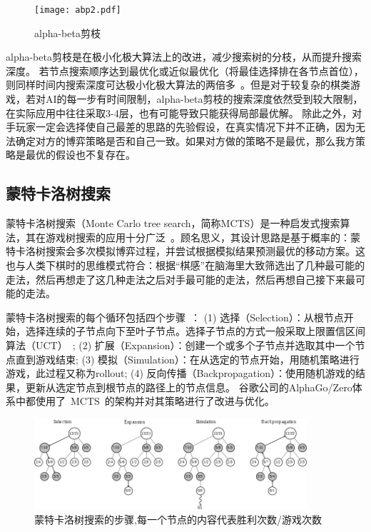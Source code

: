 \begin{figure}[htb]
    \centering
    \texttt{[image: abp2.pdf]}
    \caption[abp2]{%
    alpha-beta剪枝~\cite{russell2010artificial}%
      }
    \label{fig:abp2}
  \end{figure}
\newpage
alpha-beta剪枝是在极小化极大算法上的改进，减少搜索树的分枝，从而提升搜索深度。
若节点搜索顺序达到最优化或近似最优化（将最佳选择排在各节点首位），则同样时间内搜索深度可达极小化极大算法的两倍多~\cite{KNUTH1975293abp}。但是对于较复杂的棋类游戏，若对AI的每一步有时间限制，alpha-beta剪枝的搜索深度依然受到较大限制，在实际应用中往往采取3-4层，也有可能导致只能获得局部最优解。
除此之外，对手玩家一定会选择使自己最差的思路的先验假设，在真实情况下并不正确，因为无法确定对方的博弈策略是否和自己一致。如果对方做的策略不是最优，那么我方策略是最优的假设也不复存在。

\subsection{蒙特卡洛树搜索}
蒙特卡洛树搜索（Monte Carlo tree search，简称MCTS）是一种启发式搜索算法，其在游戏树搜索的应用十分广泛~\cite{10.1007/978-3-540-75538-8_7}。顾名思义，其设计思路是基于概率的：蒙特卡洛树搜索会多次模拟博弈过程，并尝试根据模拟结果预测最优的移动方案。这也与人类下棋时的思维模式符合：根据“棋感”在脑海里大致筛选出了几种最可能的走法，然后再想走了这几种走法之后对手最可能的走法，然后再想自己接下来最可能的走法。

蒙特卡洛树搜索的每个循环包括四个步骤~\cite{RePEc:wsi:nmncxx:v:04:y:2008:i:03:n:s1793005708001094}：
(1) 选择（Selection）：从根节点开始，选择连续的子节点向下至叶子节点。选择子节点的方式一般采取上限置信区间算法（UCT）~\cite{10.1007/11871842_29};
(2) 扩展（Expansion）：创建一个或多个子节点并选取其中一个节点直到游戏结束;
(3) 模拟（Simulation）：在从选定的节点开始，用随机策略进行游戏，此过程又称为rollout;
(4) 反向传播（Backpropagation）：使用随机游戏的结果，更新从选定节点到根节点的路径上的节点信息。
谷歌公司的AlphaGo/Zero体系中都使用了~MCTS~的架构并对其策略进行了改进与优化。

\begin{figure}[htb]
    \centering
    \includegraphics[width=0.9\textwidth]{mctswiki.png}
    \caption[mcts]{%
    蒙特卡洛树搜索的步骤,每一个节点的内容代表胜利次数/游戏次数~\cite{RePEc:wsi:nmncxx:v:04:y:2008:i:03:n:s1793005708001094}%
      }
    \label{fig:mcts}
\end{figure}

